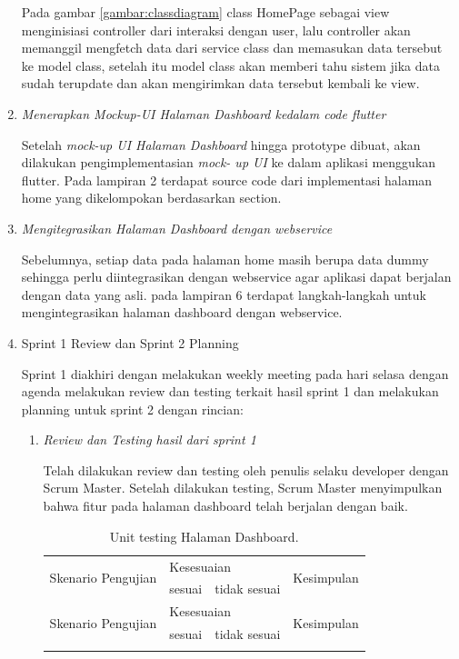 \begin{enumerate}[listparindent=2em]
	Pada gambar \ref{gambar:classdiagram} class HomePage sebagai view menginisiasi controller dari interaksi dengan user, lalu controller akan memanggil mengfetch data dari service class dan memasukan data tersebut ke model class, setelah itu model class akan memberi tahu sistem jika data sudah terupdate dan akan mengirimkan data tersebut kembali ke view.

	\item{\textit{Menerapkan Mockup-UI Halaman Dashboard kedalam code flutter}}
	
	Setelah \textit{mock-up UI Halaman Dashboard} hingga prototype dibuat, akan dilakukan pengimplementasian \textit{mock- up UI} ke dalam aplikasi menggukan flutter. Pada lampiran 2 terdapat source code dari implementasi halaman home yang dikelompokan berdasarkan section.

	\item{\textit{Mengitegrasikan Halaman Dashboard dengan webservice}}
	
	Sebelumnya, setiap data pada halaman home masih berupa data dummy sehingga perlu diintegrasikan dengan webservice agar aplikasi dapat berjalan dengan data yang asli. pada lampiran 6 terdapat langkah-langkah untuk mengintegrasikan halaman dashboard dengan webservice.
	

\item{Sprint 1 Review dan Sprint 2 Planning}

Sprint 1 diakhiri dengan melakukan weekly meeting pada hari selasa dengan agenda melakukan review dan testing terkait hasil sprint 1 dan melakukan planning untuk sprint 2 dengan rincian:
\begin{enumerate}
	\item{\textit{Review dan Testing hasil dari sprint 1}}

	Telah dilakukan review dan testing oleh penulis selaku developer dengan Scrum Master. Setelah dilakukan testing, Scrum Master menyimpulkan bahwa fitur pada halaman dashboard telah berjalan dengan baik.

	\begin{longtable}{| p{8cm} | c | c | l |}
		\caption{Unit testing Halaman Dashboard.\label{table:unit_testing_fitur_dashboard}}\\
		\hline
		\multirow{2}{*}{Skenario Pengujian} & \multicolumn{2}{l|}{Kesesuaian} & \multirow{2}{*}{Kesimpulan} \\ 
		\cline{2-3}
		  & \multicolumn{1}{l|}{sesuai} & tidak sesuai & \\ 
		\hline
		\hline
		\endfirsthead
		\hline
		\multirow{2}{*}{Skenario Pengujian} & \multicolumn{2}{l|}{Kesesuaian} & \multirow{2}{*}{Kesimpulan} \\ 
		\cline{2-3}
		  & \multicolumn{1}{l|}{sesuai} & tidak sesuai &  \\ 
		\hline
		\hline
		\endhead
		\hline
		\endfoot
		

\end{longtable}
\end{enumerate}
\end{enumerate}

